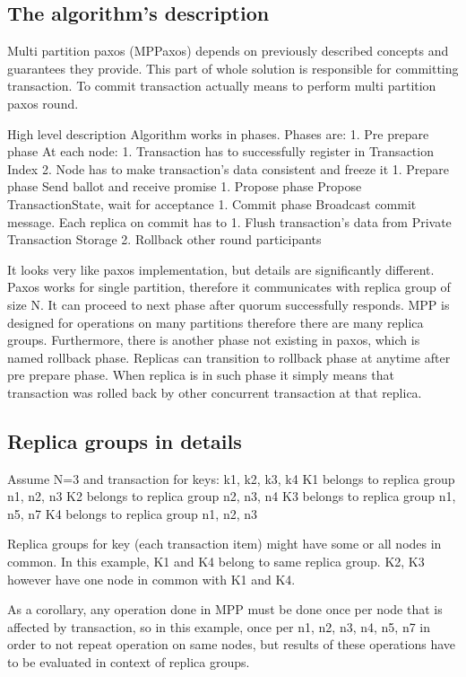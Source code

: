 \subsection{The algorithm's description}
Multi partition paxos (MPPaxos) depends on previously described concepts and guarantees they provide. This part of whole solution is responsible for committing transaction. To commit transaction actually means to perform multi partition paxos round. 


        High level description
Algorithm works in phases. Phases are:
1. Pre prepare phase
At each node:
   1. Transaction has to successfully register in Transaction Index
   2. Node has to make transaction’s data consistent and freeze it
1. Prepare phase
Send ballot and receive promise
1. Propose phase
Propose TransactionState, wait for acceptance
1. Commit phase
        Broadcast commit message. Each replica on commit has to
   1. Flush transaction’s data from Private Transaction Storage
   2. Rollback other round participants
        
It looks very like paxos implementation, but details are significantly different. 
Paxos works for single partition, therefore it communicates with replica group of size N. It can proceed to next phase after quorum successfully responds. 
MPP is designed for operations on many partitions therefore there are many replica groups. 
Furthermore, there is another phase not existing in paxos, which is named rollback phase. Replicas can transition to rollback phase at anytime after pre prepare phase. When replica is in such phase it simply means that transaction was rolled back by other concurrent transaction at that replica. 


\subsection{Replica groups in details}
Assume N=3 and transaction for keys: k1, k2, k3, k4 
K1 belongs to replica group n1, n2, n3
K2 belongs to replica group n2, n3, n4
K3 belongs to replica group n1, n5, n7
K4 belongs to replica group n1, n2, n3


Replica groups for key (each transaction item) might have some or all nodes in common.
In this example, K1 and K4 belong to same replica group. K2, K3 however have one node in common with K1 and K4.


As a corollary, any operation done in MPP must be done once per node that is affected by transaction, so in this example, once per n1, n2, n3, n4, n5, n7 in order to not repeat operation on same nodes, but results of these operations have to be evaluated in context of replica groups. 


